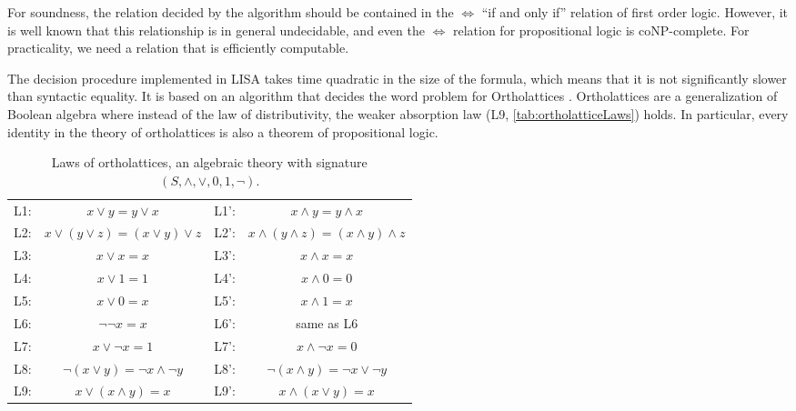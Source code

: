 For soundness, the relation decided by the algorithm should be contained in the $\iff$ ``if and only if'' relation of first order logic. However, it is well known that this relationship is in general undecidable, and even the $\iff$ relation for propositional logic is coNP-complete. For practicality, we need a relation that is efficiently computable.

The decision procedure implemented in LISA takes time quadratic in the size of the formula, which means that it is not significantly slower than syntactic equality.
It is based on an algorithm that decides the word problem for Ortholattices \cite{guilloudFormulaNormalizationsVerification2023a}.
Ortholattices are a generalization of Boolean algebra where instead of the law of distributivity, the weaker absorption law (L9, \autoref{tab:ortholatticeLaws}) holds. In particular, every identity in the theory of ortholattices is also a theorem of propositional logic.
\begin{table}[bth]
  \centering
  \begin{tabular}{r c @{\hskip 2em} | @{\hskip 2em} r c}
    L1: & $x \lor y = y \lor x$                    & L1': & $x \land y = y \land x$                      \\
    L2: & $x \lor ( y \lor z) = (x \lor y) \lor z$ & L2': & $x \land ( y \land z) = (x \land y) \land z$ \\
    L3: & $x \lor x = x$                           & L3': & $x \land x = x$                              \\
    L4: & $x \lor 1 = 1$                           & L4': & $x \land 0 = 0$                              \\
    L5: & $x \lor 0 = x$                           & L5': & $x \land 1 = x$                              \\
    L6: & $\neg \neg x = x$                        & L6': & same as L6                                   \\
    L7: & $x \lor \neg x = 1$                      & L7': & $x \land \neg x = 0$                         \\
    L8: & $\neg (x \lor y) = \neg x \land \neg y$  & L8': & $\neg (x \land y) = \neg x \lor \neg y$      \\
    L9: & $x \lor (x \land y) = x$                 & L9': & $x \land (x \lor y) = x$                     \\
  \end{tabular}
  \caption{Laws of ortholattices, an algebraic theory with signature $(S, \land, \lor, 0, 1, \neg)$.}
  \label{tab:ortholatticeLaws} 
\end{table}


